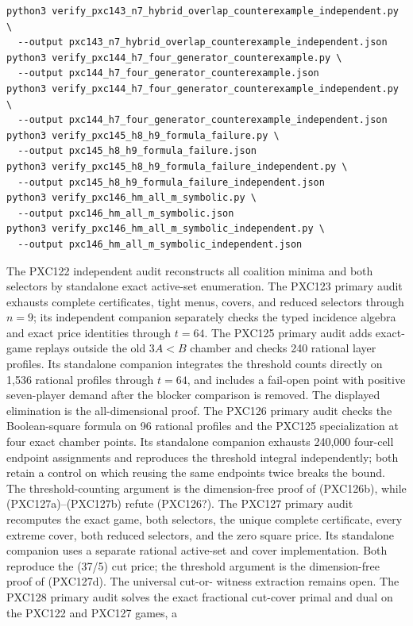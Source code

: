 \documentclass[11pt]{article}
\begin{document}
\begin{verbatim}
python3 verify_pxc143_n7_hybrid_overlap_counterexample_independent.py \
  --output pxc143_n7_hybrid_overlap_counterexample_independent.json
python3 verify_pxc144_h7_four_generator_counterexample.py \
  --output pxc144_h7_four_generator_counterexample.json
python3 verify_pxc144_h7_four_generator_counterexample_independent.py \
  --output pxc144_h7_four_generator_counterexample_independent.json
python3 verify_pxc145_h8_h9_formula_failure.py \
  --output pxc145_h8_h9_formula_failure.json
python3 verify_pxc145_h8_h9_formula_failure_independent.py \
  --output pxc145_h8_h9_formula_failure_independent.json
python3 verify_pxc146_hm_all_m_symbolic.py \
  --output pxc146_hm_all_m_symbolic.json
python3 verify_pxc146_hm_all_m_symbolic_independent.py \
  --output pxc146_hm_all_m_symbolic_independent.json
\end{verbatim}
The PXC122 independent audit reconstructs all coalition minima and both
selectors by standalone exact active-set enumeration.  The PXC123 primary
audit exhausts complete certificates, tight menus, covers, and reduced
selectors through \(n=9\); its independent companion separately checks the
typed incidence algebra and exact price identities through \(t=64\).  The
PXC125 primary audit adds exact-game replays outside the old \(3A<B\)
chamber and checks 240 rational layer profiles.  Its standalone companion
integrates the threshold counts directly on 1,536 rational profiles through
\(t=64\), and includes a fail-open point with positive seven-player demand
after the blocker comparison is removed.  The displayed elimination is the
all-dimensional proof.  The PXC126 primary audit checks the Boolean-square
formula on 96 rational profiles and the PXC125 specialization at four exact
chamber points.  Its standalone companion exhausts 240,000 four-cell endpoint
assignments and reproduces the threshold integral independently; both retain
a control on which reusing the same endpoints twice breaks the bound.  The
threshold-counting argument is the dimension-free proof of (PXC126b), while
(PXC127a)--(PXC127b) refute (PXC126?).  The PXC127 primary audit recomputes
the exact game, both selectors, the unique complete certificate, every
extreme cover, both reduced selectors, and the zero square price.  Its
standalone companion uses a separate rational active-set and cover
implementation.  Both reproduce the (37/5) cut price; the threshold
argument is the dimension-free proof of (PXC127d).  The universal cut-or-
witness extraction remains open.  The PXC128 primary audit solves the exact
fractional cut-cover primal and dual on the PXC122 and PXC127 games, a
\end{document}
